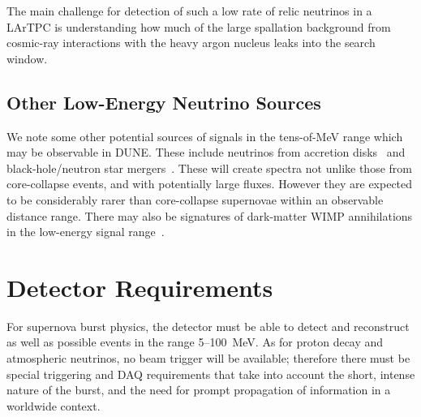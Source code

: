  The main challenge for detection of such
a low rate of relic neutrinos in a LArTPC is understanding how much of
the large spallation background from cosmic-ray interactions with the
heavy argon nucleus 
leaks into the search window. 

\subsection{Other Low-Energy Neutrino Sources}

We note some other potential sources of signals in the tens-of-MeV range which may be observable in DUNE.  These include neutrinos from accretion disks~\cite{Caballero:2011dw} and black-hole/neutron star mergers~\cite{Caballero:2009ww}.  These will create spectra not unlike those from core-collapse events, and with potentially large fluxes.  However they are expected to be considerably rarer than core-collapse supernovae within an observable distance range.  There may also be signatures of dark-matter WIMP annihilations in the low-energy signal range~\cite{Rott:2012qb, Bernal:2012qh}.



\section{Detector Requirements}
\label{sec:physics-snblowe-detector-requirements}

For supernova burst physics, the detector must be able to detect and reconstruct as well as possible events in the range 5--100~MeV.  As for proton decay and atmospheric neutrinos, no beam trigger will be available; therefore there must be special triggering and DAQ requirements that take into account the short, intense nature of the burst, and the need for prompt propagation of information in a worldwide context.

